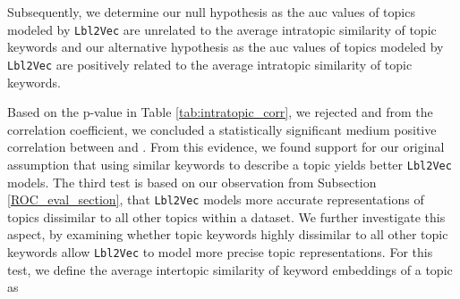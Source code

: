 \documentclass[a4paper,twoside]{article}
\begin{document}
Subsequently, we determine our null hypothesis  as the \ac{auc} values of topics modeled by \texttt{Lbl2Vec} are unrelated to the average intratopic similarity of topic keywords and our alternative hypothesis  as the \ac{auc} values of topics modeled by \texttt{Lbl2Vec} are positively related to the average intratopic similarity of topic keywords. 
\begin{table}[ht]
\centering
{}\caption{\label{tab:intratopic_corr} Correlation values that measure the relationship between  average intratopic similarity of topic keywords and  value of a topic.  and .}
\end{table}
Based on the p-value in Table \ref{tab:intratopic_corr}, we rejected  and from the correlation coefficient, we concluded a statistically significant medium positive correlation between  and . From this evidence, we found support for our original assumption that using similar keywords to describe a topic yields better \texttt{Lbl2Vec} models. \newline
\newline The third test is based on our observation from Subsection \ref{ROC_eval_section}, that \texttt{Lbl2Vec} models more accurate representations of topics dissimilar to all other topics within a dataset. We further investigate this aspect, by examining whether topic keywords highly dissimilar to all other topic keywords allow \texttt{Lbl2Vec} to model more precise topic representations. For this test, we define the average intertopic similarity of keyword embeddings  of a topic  as 
\end{document}
